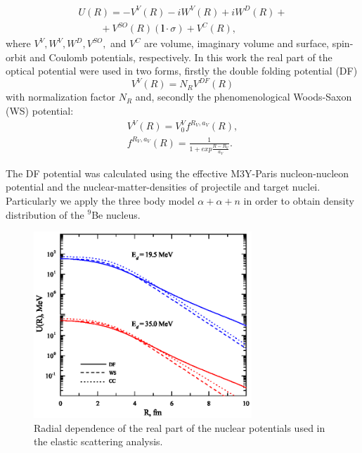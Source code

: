 \documentclass[10pt]{iopart}
\begin{document}
\begin{equation}\label{eqn:OP}
\begin{array}{l}
 U(R)=-V^{V}(R)-iW^{V}(R)+iW^D(R)+\\
~~~ ~~~~~~~+V^{SO}(R)( \mathbf{l} \cdot \sigma )+V^C(R),
\end{array}
\end{equation}
where $V^{V}, W^{V}, W^D, V^{SO},$ and $V^C$ are volume, imaginary volume and surface, spin-orbit and Coulomb potentials, respectively. In this work the real part of the optical potential were used in two forms, firstly the double folding potential (DF)
\begin{equation}
V^V(R) = N_R V^{DF}(R)
\end{equation}
with normalization factor $N_R$ and, secondly the phenomenological Woods-Saxon (WS) potential:
\begin{eqnarray}
V^V(R) =  V^V_0 f^{R_V, a_V}(R), \\
 f^{R_V,a_V}(R)=\frac{1}{1+exp{\frac{R-R_V}{a_V}}}.
\end{eqnarray}

The DF potential was calculated using the effective M3Y-Paris nucleon-nucleon potential and the nuclear-matter-densities of projectile and target nuclei. Particularly we apply the three body model $\alpha+\alpha+n$ \cite{urazbekov2016} in order to obtain density distribution of the $^9$Be nucleus.

\begin{figure}[tp]
\centering
\includegraphics[width=8.2cm]{POT.eps}
\caption{ \label{POT}  \footnotesize Radial dependence of the real part of the nuclear potentials used in the elastic scattering analysis. }
\end{figure}
\end{document}
